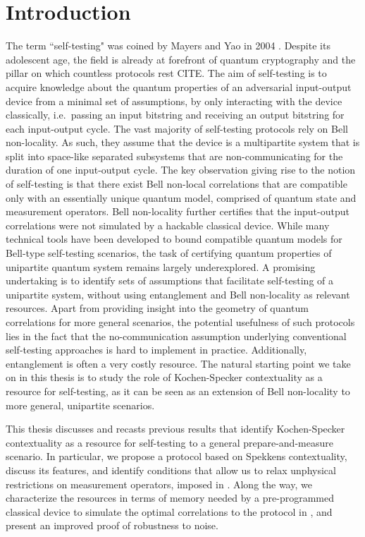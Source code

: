 \chapter{Introduction}
The term ``self-testing" was coined by Mayers and Yao in 2004 \cite{Mayers2003}. Despite its adolescent age, the field is already at forefront of quantum cryptography and the pillar on which countless protocols rest CITE. The aim of self-testing is to acquire knowledge about the quantum properties of an adversarial input-output device from a minimal set of assumptions, by only interacting with the device classically, i.e.\ passing an input bitstring and receiving an output bitstring for each input-output cycle. The vast majority of self-testing protocols rely on Bell non-locality. As such, they assume that the device is a multipartite system that is split into space-like separated subsystems that are non-communicating for the duration of one input-output cycle. The key observation giving rise to the notion of self-testing is that there exist Bell non-local correlations that are compatible only with an essentially unique quantum model, comprised of quantum state and measurement operators. Bell non-locality further certifies that the input-output correlations were not simulated by a hackable classical device. While
many technical tools have been developed to bound compatible quantum models for Bell-type self-testing scenarios, the task of certifying quantum properties of unipartite quantum system remains largely underexplored. A promising undertaking is to identify sets of assumptions that facilitate self-testing of a unipartite system, without using entanglement and Bell non-locality as relevant resources. Apart from providing insight into the geometry of quantum correlations for more general scenarios, the potential usefulness of such protocols lies in the fact that the no-communication assumption underlying conventional self-testing approaches is hard to implement in practice. Additionally, entanglement is often a very costly resource. The natural starting point we take on in this thesis is to study the role of Kochen-Specker contextuality as a resource for self-testing, as it can be seen as an extension of Bell non-locality to more general, unipartite scenarios. 

This thesis discusses and recasts previous results \cite{Bharti2019} that identify Kochen-Specker contextuality as a resource for self-testing to a general prepare-and-measure scenario. In particular, we propose a protocol based on Spekkens contextuality, discuss its features, and identify conditions that allow us to relax unphysical restrictions on measurement operators, imposed in \cite{Bharti2019}. Along the way, we characterize the resources in terms of memory needed by a pre-programmed classical device to simulate the optimal correlations to the protocol in \cite{Bharti2019}, and present an improved proof of robustness to noise.

